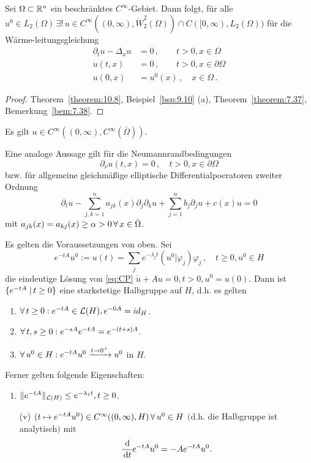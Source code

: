 \begin{kor}
\label{kor:10.9}
Sei $\Omega \subset \mathbb{R}^n$ ein beschränktes $C^\infty$-Gebiet. Dann folgt, für alle $u^0 \in L_2(\Omega)\, \exists ! \, u \in C^\infty((0,\infty),\mathring W^2_2(\Omega)) \cap C([0,\infty),L_2(\Omega))$ für die Wärme-leitungsgleichung
\begin{align*}
	\partial_t u -\Delta_x u & = 0 \, , \qquad t > 0 , x \in \Omega \\
	u(t,x) &= 0 \, , \qquad t > 0, x \in \partial \Omega \\
	u(0,x) & = u^0 (x) \, , \quad x \in \Omega \, .
\end{align*}
\end{kor}

\begin{proof}
Theorem~\ref{theorem:10.8}, Beispiel~\ref{bsp:9.10} (a), Theorem~\ref{theorem:7.37}, Bemerkung~\ref{bem:7.38}.
\end{proof}

\begin{bem*}
Es gilt $u \in C^\infty((0,\infty),C^\infty(\bar\Omega))$.
\end{bem*}

\begin{bem}
\label{bem:10.10}
Eine analoge Aussage gilt für die Neumannrandbedingungen
\[
	\partial_\nu u (t,x) = 0 \, , \quad t > 0, x \in \partial\Omega
\]
bzw. für allgemeine gleichmäßige elliptische Differentialpoeratoren zweiter Ordnung
\[
	\partial_t u - \sum_{j,k=1}^n a_{jk}(x) \partial_j\partial_k u + \sum_{j=1}^n b_j \partial_j u + c(x) u = 0
\]
mit $a_{jk} (x) = a_{kj} (x) \geq \alpha > 0 \, \forall \, x \in \bar \Omega$.
\end{bem}

\begin{theorem}
\label{theorem:10.11}
Es gelten die Voraussetzungen von oben. Sei
\[
	e^{-tA} u^0 := u(t) = \sum_j e^{-\lambda_j t} (u^0|\varphi_j)\varphi_j \, , \quad t \geq 0 , u^0 \in H
\]
die eindeutige Lösung von \eqref{eq:CP} $\dot u + Au = 0, t>0, u^0 = u(0)$. Dann ist $\{e^{-tA} \;\vert\, t\geq 0\}$ eine starkstetige Halbgruppe auf $H$, d.h. es gelten
\begin{enumerate}[\rm(i)]
\item $\forall \, t \geq 0: e^{-tA} \in \mathcal L(H), e^{-0A} = id_H$.
\item $\forall \, t,s \geq 0: e^{-sA} e^{-tA} = e^{-(t+s)A}$.
\item $\forall \, u^0 \in H: e^{-tA} u^0 \xrightarrow{t\rightarrow 0^+} u^0$ in $H$.
\end{enumerate}
Ferner gelten folgende Eigenschaften:
\begin{enumerate}[\rm(iv)]
\item $\lVert e^{-tA}\rVert_{\mathcal L(H)} \leq e^{-\lambda_1 t} , t \geq 0$.
\item[\rm(v)] $(t\mapsto e^{-tA} u^0) \in C^\infty ((0,\infty), H) \, \forall \, u^0 \in H$ $($d.h. die Halbgruppe ist analytisch$)$ mit 
\[
	\frac{\,\mathrm{d}}{\,\mathrm{d} t} e^{-tA} u^0 = -A e^{-tA} u^0 .
\]
\end{enumerate}
\end{theorem}

